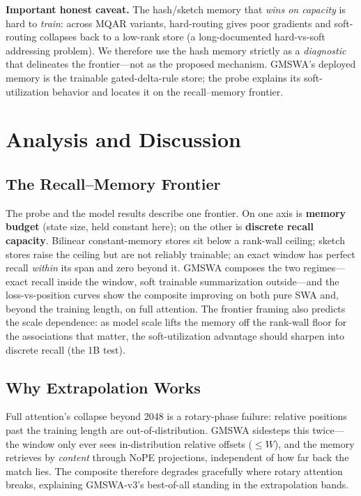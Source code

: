 \documentclass[letterpaper]{article} %
\begin{document}
\textbf{Important honest caveat.} The hash/sketch memory that \emph{wins on capacity} is hard to \emph{train}: across MQAR variants, hard-routing gives poor gradients and soft-routing collapses back to a low-rank store (a long-documented hard-vs-soft addressing problem). We therefore use the hash memory strictly as a \emph{diagnostic} that delineates the frontier---not as the proposed mechanism. GMSWA's deployed memory is the trainable gated-delta-rule store; the probe explains its soft-utilization behavior and locates it on the recall--memory frontier.

\section{Analysis and Discussion}

\subsection{The Recall--Memory Frontier}
The probe and the model results describe one frontier. On one axis is \textbf{memory budget} (state size, held constant here); on the other is \textbf{discrete recall capacity}. Bilinear constant-memory stores sit below a rank-wall ceiling; sketch stores raise the ceiling but are not reliably trainable; an exact window has perfect recall \emph{within} its span and zero beyond it. GMSWA composes the two regimes---exact recall inside the window, soft trainable summarization outside---and the loss-vs-position curves show the composite improving on both pure SWA and, beyond the training length, on full attention. The frontier framing also predicts the scale dependence: as model scale lifts the memory off the rank-wall floor for the associations that matter, the soft-utilization advantage should sharpen into discrete recall (the 1B test).

\subsection{Why Extrapolation Works}
Full attention's collapse beyond 2048 is a rotary-phase failure: relative positions past the training length are out-of-distribution. GMSWA sidesteps this twice---the window only ever sees in-distribution relative offsets ($\le W$), and the memory retrieves by \emph{content} through NoPE projections, independent of how far back the match lies. The composite therefore degrades gracefully where rotary attention breaks, explaining GMSWA-v3's best-of-all standing in the extrapolation bands.
\end{document}
